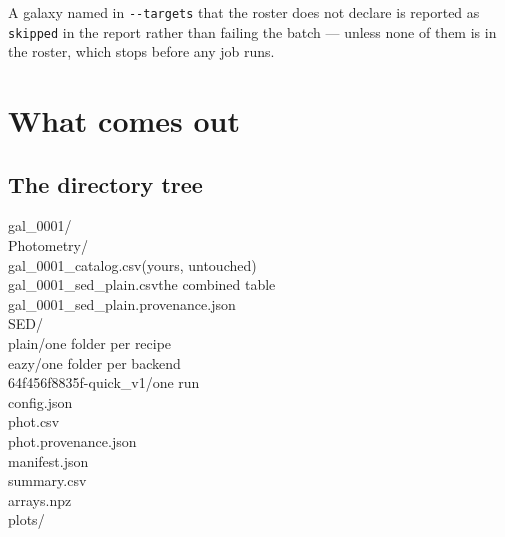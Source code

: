 \documentclass[11pt]{article}
\begin{document}
A galaxy named in \texttt{-{}-targets} that the roster does not declare
is reported as \texttt{skipped} in the report rather than failing the
batch --- unless none of them is in the roster, which stops before any
job runs.

\section{What comes out}

\subsection{The directory tree}

\begin{cmd}\ttfamily
gal\_0001/\\
\hspace*{2em}Photometry/\\
\hspace*{4em}gal\_0001\_catalog.csv\hspace*{2em}(yours, untouched)\\
\hspace*{4em}gal\_0001\_sed\_plain.csv\hspace*{1em}the combined table\\
\hspace*{4em}gal\_0001\_sed\_plain.provenance.json\\
\hspace*{2em}SED/\\
\hspace*{4em}plain/\hspace*{9em}one folder per recipe\\
\hspace*{6em}eazy/\hspace*{8.5em}one folder per backend\\
\hspace*{8em}64f456f8835f-quick\_v1/\hspace*{1em}one run\\
\hspace*{10em}config.json\\
\hspace*{10em}phot.csv\\
\hspace*{10em}phot.provenance.json\\
\hspace*{10em}manifest.json\\
\hspace*{10em}summary.csv\\
\hspace*{10em}arrays.npz\\
\hspace*{10em}plots/
\end{cmd}
\end{document}
